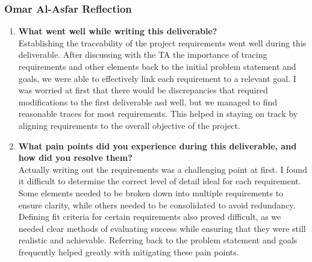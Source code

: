 \begin{enumerate}
\subsubsection*{Omar Al-Asfar Reflection}
\begin{enumerate}
  \item \textbf{What went well while writing this deliverable?} \\
  Establishing the traceability of the project requirements went well during this deliverable. After discussing with the TA the importance of tracing requirements and other elements back to the initial problem statement and goals, we were able to effectively link each requirement to a relevant goal. I was worried at first that there would be discrepancies that required modifications to the first deliverable asd well, but we managed to find reasonable traces for most requirements. This helped in staying on track by aligning requirements to the overall objective of the project.
  \item \textbf{What pain points did you experience during this deliverable, and how did you resolve them?} \\
  Actually writing out the requirements was a challenging point at first. I found it difficult to determine the correct level of detail ideal for each requirement. Some elements needed to be broken down into multiple requirements to ensure clarity, while others needed to be consolidated to avoid redundancy. Defining fit criteria for certain requirements also proved difficult, as we needed clear methods of evaluating success while ensuring that they were still realistic and achievable. Referring back to the problem statement and goals frequently helped greatly with mitigating these pain points.
\end{enumerate}


\end{enumerate}
